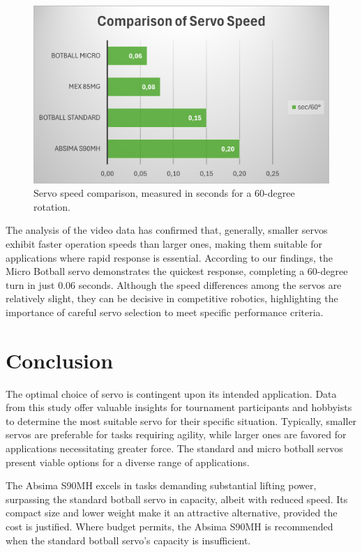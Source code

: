 \documentclass[conference]{IEEEtran}
\begin{document}
\begin{figure}[H]
\centering
\includegraphics[width=\linewidth]{speed_comparison_chart.png}
\caption{Servo speed comparison, measured in seconds for a 60-degree rotation.}
\label{fig:speed_comparison}
\end{figure}

The analysis of the video data has confirmed that, generally, smaller servos exhibit faster operation speeds than larger ones, making them suitable for applications where rapid response is essential. According to our findings, the Micro Botball servo demonstrates the quickest response, completing a 60-degree turn in just 0.06 seconds. Although the speed differences among the servos are relatively slight, they can be decisive in competitive robotics, highlighting the importance of careful servo selection to meet specific performance criteria.

\section{Conclusion}
The optimal choice of servo is contingent upon its intended application. Data from this study offer valuable insights for tournament participants and hobbyists to determine the most suitable servo for their specific situation. Typically, smaller servos are preferable for tasks requiring agility, while larger ones are favored for applications necessitating greater force. The standard and micro botball servos present viable options for a diverse range of applications.

The Absima S90MH excels in tasks demanding substantial lifting power, surpassing the standard botball servo in capacity, albeit with reduced speed. Its compact size and lower weight make it an attractive alternative, provided the cost is justified. Where budget permits, the Absima S90MH is recommended when the standard botball servo's capacity is insufficient.
\end{document}
